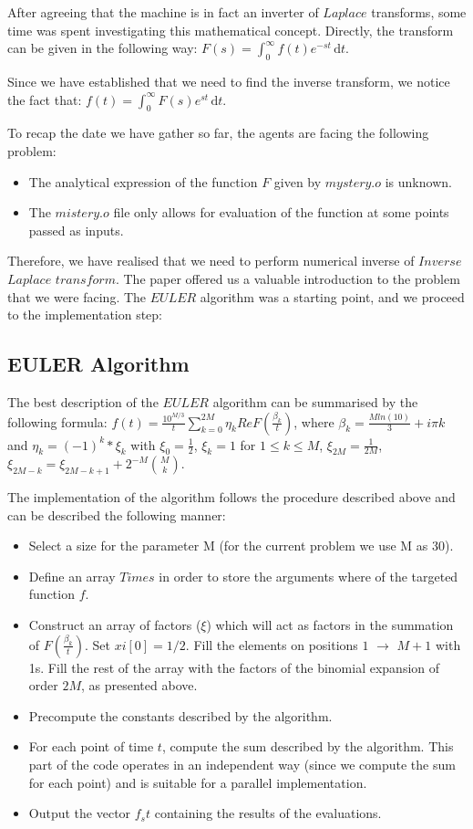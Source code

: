 After agreeing that the machine is in fact an inverter of $Laplace$ transforms, some time was spent investigating 
this mathematical concept. Directly, the transform can be given in the following way:
$F(s) =\int_0^\infty \! f(t)e^{-st} \, \mathrm{d}t$.

Since we have established that we need to find the inverse transform, we notice the fact that:
$f(t) =\int_0^\infty \! F(s)e^{st} \, \mathrm{d}t$. 
\newline

To recap the date we have  gather so far, the agents are facing the following problem:
\begin{itemize}
\item{The analytical expression of the function $F$ given by $mystery.o$ is unknown. }
\item{The $mistery.o$ file only allows for evaluation of the function at some points passed as inputs. }
\end{itemize}

Therefore, we have realised that we need to perform numerical inverse of $Inverse$ $Laplace$ $transform$.
The paper offered us a valuable introduction to the problem that we were facing.
The $EULER$ algorithm was a starting point, and we proceed to the implementation step:

\subsection{EULER Algorithm}
The best description\cite{abate} of the $EULER$ algorithm can be summarised by the following formula:
$f(t) = \frac{10^{M/3}}{t} \sum\limits_{k=0}^{2M} {\eta_k Re F(\frac{\beta_k}{t}) }$, where $\beta_k = \frac{M ln(10)}{3} + i\pi k$ and $\eta_k = (-1)^{k} *\xi_k$ with $\xi_0 = \frac{1}{2}$, $\xi_k = 1$ for $1 \leq k \leq M$, $\xi_{2M} = \frac{1}{2M}$, $\xi_{2M-k} = \xi_{2M-k+1}+2^{-M}\binom{M}{k}$.
\newline

The implementation of the algorithm follows the procedure described above and can be described the following manner:
\begin{itemize}
\item{Select a size for the parameter M (for the current problem we use M as 30).}
\item{Define an array $Times$ in order to store the arguments where of the targeted function $f$.}
\item{Construct an array of factors ($\xi$) which will act as factors in the summation of $F(\frac{\beta_k}{t})$. Set $xi[0] = 1/2$. Fill the elements on positions $1$ $\to$ $M+1$ with 1s. Fill the rest of the array with the factors of the binomial expansion of order $2M$, as presented above.}
\item{Precompute the constants described by the algorithm.}
\item{For each point of time $t$, compute the sum described by the algorithm. This part of the code operates in an independent way (since we compute the sum for each point) and is suitable for a parallel implementation.}
\item{Output the vector $f_st$ containing the results of the evaluations.}
\end{itemize} 


